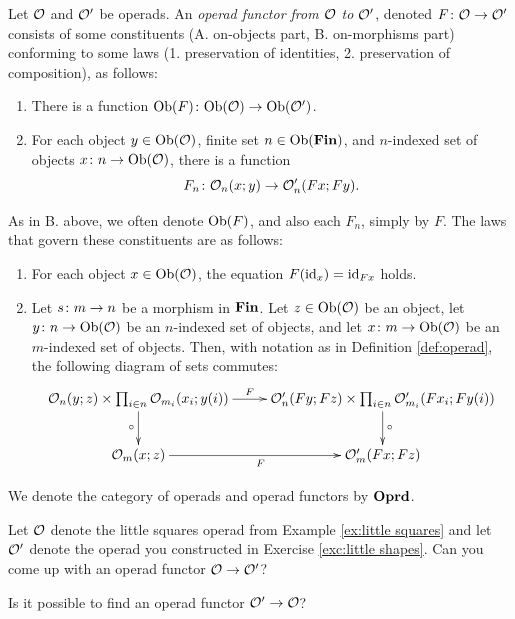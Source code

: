 \begin{definition}\label{def:operad morphism}

Let $\mathcal{O}$ and $\mathcal{O}'$ be operads. An {\em operad functor from $\mathcal{O}$ to $\mathcal{O}'$}, denoted $F\colon\mathcal{O}\rightarrow\mathcal{O}'$ consists of some constituents (A. on-objects part, B. on-morphisms part) conforming to some laws (1. preservation of identities, 2. preservation of composition), as follows:
\begin{enumerate}[\hsp A.]
\item There is a function $\textnormal{Ob}(F)\colon\textnormal{Ob}(\mathcal{O})\rightarrow\textnormal{Ob}(\mathcal{O}')$.
\item For each object $y\in\textnormal{Ob}(\mathcal{O})$, finite set $n\in\textnormal{Ob}({\bf Fin})$, and $n$-indexed set of objects $x\colon n\rightarrow\textnormal{Ob}(\mathcal{O})$, there is a function $$F_n\colon\mathcal{O}_n(x;y)\rightarrow\mathcal{O}'_n(Fx;Fy).$$
\end{enumerate}
As in B. above, we often denote $\textnormal{Ob}(F)$, and also each $F_n$, simply by $F$. The laws that govern these constituents are as follows:
\begin{enumerate}[\hsp 1.]
\item For each object $x\in\textnormal{Ob}(\mathcal{O})$, the equation $F(\textnormal{id}_x)=\textnormal{id}_{Fx}$ holds.
\item Let $s\colon m\rightarrow n$ be a morphism in ${\bf Fin}$. Let $z\in\textnormal{Ob}(\mathcal{O})$ be an object, let $y\colon n\rightarrow\textnormal{Ob}(\mathcal{O})$ be an $n$-indexed set of objects, and let $x\colon m\rightarrow\textnormal{Ob}(\mathcal{O})$ be an $m$-indexed set of objects. Then, with notation as in Definition \ref{def:operad}, the following diagram of sets commutes:
\begin{align}\label{dia:operad functor on composition}
\xymatrix{
\mcO_n(y;z)\times\prod_{i\in n}\mcO_{m_i}(x_i;y(i))\ar[r]^-F\ar[d]_\circ&
\mcO'_n(Fy;Fz)\times\prod_{i\in n}\mcO'_{m_i}(Fx_i;Fy(i))\ar[d]^\circ\\
\mcO_m(x;z)\ar[r]_F&\mcO'_m(Fx;Fz)
}
\end{align}
\end{enumerate}

We denote the category of operads and operad functors by ${\bf Oprd}$.

\end{definition}

\begin{exercise}
Let $\mathcal{O}$ denote the little squares operad from Example \ref{ex:little squares} and let $\mathcal{O}'$ denote the operad you constructed in Exercise \ref{exc:little shapes}.
\sexc Can you come up with an operad functor $\mathcal{O}\rightarrow\mathcal{O}'$?
\item Is it possible to find an operad functor $\mathcal{O}'\rightarrow\mathcal{O}$? 
\endsexc
\end{exercise}

